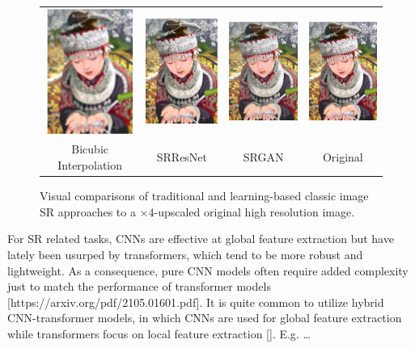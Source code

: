 \documentclass{article}
\begin{document}
\begin{figure}\label{fig:example}
    \centering
    \begin{tabular}{c c c c}
        \includegraphics[width=80pt]{bicubic.png} & \includegraphics[width=80pt]{srresnet.png} & \includegraphics[width=80pt]{srgan.png} & \includegraphics[width=80pt]{original.png} \\
        \small Bicubic Interpolation              & \small SRResNet                            & \small SRGAN                            & \small Original
    \end{tabular}
    \caption{Visual comparisons of traditional and learning-based classic image SR approaches to a $\times 4$-upscaled original high resolution image.}
\end{figure}

For SR related tasks, CNNs are effective at global feature extraction but have lately been usurped by transformers, which tend to be more robust and lightweight. As a consequence, pure CNN models often require added complexity just to match the performance of transformer models [https://arxiv.org/pdf/2105.01601.pdf]. It is quite common to utilize hybrid CNN-transformer models, in which CNNs are used for global feature extraction while transformers focus on local feature extraction []. E.g. …
\end{document}
